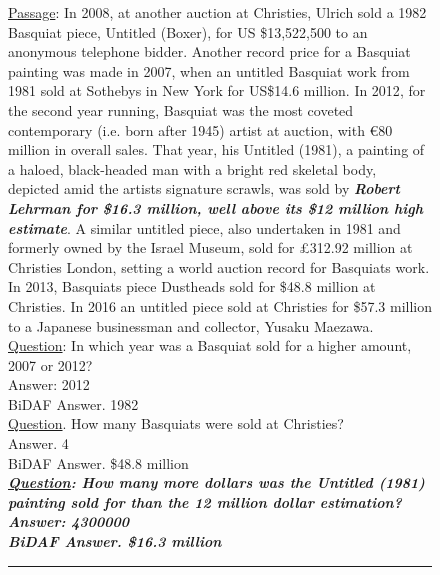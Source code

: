 \documentclass[11pt,a4paper]{article}
\begin{document}
\begin{figure}
\tiny
{\underline{Passage}: {\color{purple}In 2008, at another auction at Christies, Ulrich sold a 1982 Basquiat piece, Untitled (Boxer)}, for US \$13,522,500 to an anonymous telephone bidder. Another record price for a Basquiat painting was made {\color{olive}in 2007, when an untitled Basquiat work from 1981 sold at Sothebys in New York for US\$14.6 million}. {\color{olive}In 2012}, for the second year running, Basquiat was the most coveted contemporary (i.e. born after 1945) artist at auction, with {\color{olive}\euro 80 million in overall sales}. {\color{olive}That year}, his Untitled (1981), a painting of a haloed, black-headed man with a bright red skeletal body, depicted amid the artists signature scrawls, was  sold by \textbf{\textit{Robert Lehrman for {\color{olive}\$16.3 million}, well above its  \$12 million high estimate}}. A similar untitled piece, also undertaken in 1981 and formerly owned by the Israel Museum, {\color{purple}sold for \pounds312.92 million at Christies} London, setting a world auction record for Basquiats work. In 2013, Basquiats piece {\color{purple}Dustheads sold for \$48.8 million at Christies}. In 2016 an untitled piece sold at {\color{purple}Christies for \$57.3 million to a Japanese businessman} and collector, Yusaku Maezawa.
\\
{\color{olive} \underline{Question}: In which year was a Basquiat sold for a higher amount, 2007 or 2012?\\
    Answer: 2012\\
    BiDAF Answer. 1982
} \\
{\color{purple}
    \underline{Question}. How many Basquiats were sold at Christies?\\
    Answer. 4\\
    BiDAF Answer. \$48.8 million
}\\
\textbf{\textit{ \underline{Question}: How many more dollars was the Untitled (1981) painting sold for than the 12 million dollar estimation?\\
    Answer: 4300000\\
    BiDAF Answer. \$16.3 million
}}
}\\
    
\hrule


\end{figure}
\end{document}

